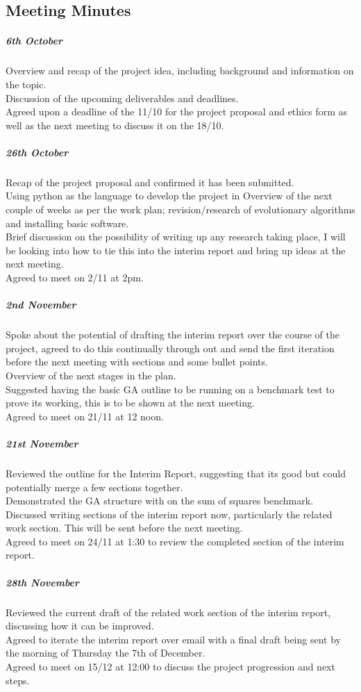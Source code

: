 \documentclass[a4paper]{article}
\begin{document}
\subsection{Meeting Minutes}
\subparagraph{6th October}
Overview and recap of the project idea, including background and information on the topic.\\
Discussion of the upcoming deliverables and deadlines.\\
Agreed upon a deadline of the 11/10 for the project proposal and ethics form as well as the next meeting to discuss it on the 18/10.
\subparagraph{26th October}
Recap of the project proposal and confirmed it has been submitted.\\
Using python as the language to develop the project in
Overview of the next couple of weeks as per the work plan; revision/research of evolutionary algorithms and installing basic software.\\
Brief discussion on the possibility of writing up any research taking place, I will be looking into how to tie this into the interim report and bring up ideas at the next meeting.\\
Agreed to meet on 2/11 at 2pm.\\
\subparagraph{2nd November}
Spoke about the potential of drafting the interim report over the course of the project, agreed to do this continually through out and send the first iteration before the next meeting with sections and some bullet points.\\
Overview of the next stages in the plan.\\
Suggested having the basic GA outline to be running on a benchmark test to prove its working, this is to be shown at the next meeting.\\
Agreed to meet on 21/11 at 12 noon.\\
\subparagraph{21st November}
Reviewed the outline for the Interim Report, suggesting that its good but could potentially merge a few sections together.\\
Demonstrated the GA structure with on the sum of squares benchmark.\\
Discussed writing sections of the interim report now, particularly the related work section. This will be sent before the next meeting.\\
Agreed to meet on 24/11 at 1:30 to review the completed section of the interim report.\\
\subparagraph{28th November}
Reviewed the current draft of the related work section of the interim report, discussing how it can be improved.\\
Agreed to iterate the interim report over email with a final draft being sent by the morning of Thursday the 7th of December.\\
Agreed to meet on 15/12 at 12:00 to discuss the project progression and next steps.\\
\end{document}
